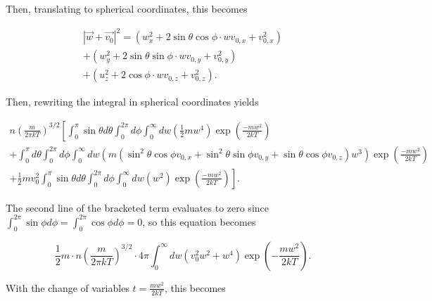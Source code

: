 \documentclass{hw-template}
\begin{document}
Then, translating to spherical coordinates, this becomes

\begin{multline}
    |\vec{w} + \vec{v_0}|^2 =\left(w_x^2 + 2\sin\theta\cos\phi \cdot w v_{0, x} + v_{0, x}^2\right)\\
     + \left(w_y^2 + 2 \sin\theta\sin\phi \cdot w v_{0, y} + v_{0, y}^2\right)\\
      + \left(u_z^2 + 2 \cos\phi \cdot wv_{0, z} + v_{0, z}^2\right).
\end{multline}

Then, rewriting the integral in spherical coordinates yields

\begin{multline}
    n {\left( \frac{m}{2\pi k T} \right)}^{3/2}  \left[\int_{0}^{\pi} \sin \theta  d\theta \int_{0}^{2\pi} d \phi \int_{0}^{\infty} dw \left(\frac{1}{2}m w^4 \right) \exp \left( \frac{-m w^2}{2kT} \right) \right. \\
    +\int_{0}^{\pi}  d\theta \int_{0}^{2\pi} d \phi \int_{0}^{\infty} dw\left(m \left(\sin^2\theta \cos \phi v_{0, x} + \sin^2\theta \sin\phi v_{0, y} + \sin\theta \cos\phi v_{0, z} \right)w^3 \right) \exp \left( \frac{-m w^2}{2kT} \right)   \\
    \left.+\frac{1}{2}m v_0^2 \int_{0}^{\pi} \sin\theta d\theta \int_{0}^{2\pi} d \phi \int_{0}^{\infty}dw \left( w^2 \right) \exp \left( \frac{-m w^2}{2kT} \right)  \right].
\end{multline}

The second line of the bracketed term evaluates to zero since $\int_{0}^{2\pi} \sin \phi d \phi = \int_{0}^{2\pi}\cos \phi d \phi = 0$, so this equation becomes


\begin{equation}
    \frac{1}{2}m\cdot n \left( \frac{m}{2\pi k T}\right)^{3/2} \cdot 4\pi \int_{0}^{\infty}dw \left(v_0^2w^2 + w^4 \right) \exp \left(- \frac{mw^2}{2kT} \right).
\end{equation}

With the change of variables $t = \frac{mw^2}{2kT}$, this becomes
\end{document}
